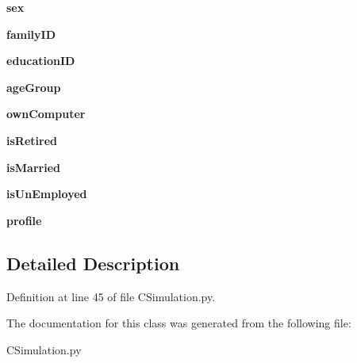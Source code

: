 \begin{DoxyCompactItemize}
\mbox{\label{class_c_simulation_1_1_simulation_1_1_building_1_1_occupant_aa4826dcd193b4161365d7457e67da538}} 
{\bfseries sex}
\item 
\mbox{\label{class_c_simulation_1_1_simulation_1_1_building_1_1_occupant_ac1ce759a8faf1379a47b12486f9870a6}} 
{\bfseries family\+ID}
\item 
\mbox{\label{class_c_simulation_1_1_simulation_1_1_building_1_1_occupant_a70b611151951af5deb863b2e95f9bb2a}} 
{\bfseries education\+ID}
\item 
\mbox{\label{class_c_simulation_1_1_simulation_1_1_building_1_1_occupant_a447f23cda1c2bdbc59a363452a231cca}} 
{\bfseries age\+Group}
\item 
\mbox{\label{class_c_simulation_1_1_simulation_1_1_building_1_1_occupant_a7a6fe25bfc965efce2ae2a9a5b1617b9}} 
{\bfseries own\+Computer}
\item 
\mbox{\label{class_c_simulation_1_1_simulation_1_1_building_1_1_occupant_a48bfa9c03f920222617ef3cd7df804f0}} 
{\bfseries is\+Retired}
\item 
\mbox{\label{class_c_simulation_1_1_simulation_1_1_building_1_1_occupant_ab82d3f752eab0bf656cf4ab2a33f81ac}} 
{\bfseries is\+Married}
\item 
\mbox{\label{class_c_simulation_1_1_simulation_1_1_building_1_1_occupant_a40bcaf70ef5162060ed12a883c1c40f2}} 
{\bfseries is\+Un\+Employed}
\item 
\mbox{\label{class_c_simulation_1_1_simulation_1_1_building_1_1_occupant_a7667610e670e037bd84c42dadbfbaa30}} 
{\bfseries profile}
\end{DoxyCompactItemize}


\subsection{Detailed Description}


Definition at line 45 of file C\+Simulation.\+py.



The documentation for this class was generated from the following file\+:\begin{DoxyCompactItemize}
\item 
C\+Simulation.\+py\end{DoxyCompactItemize}
